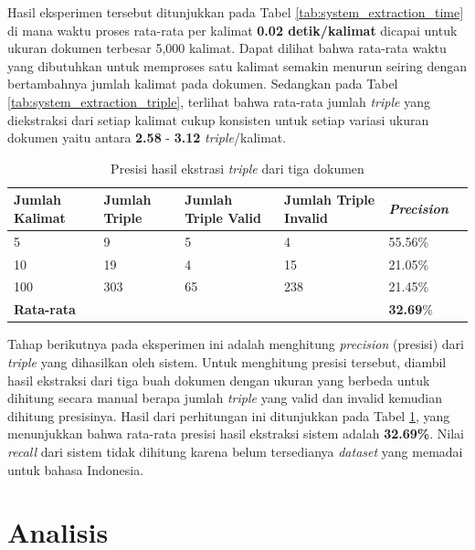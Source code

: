 Hasil eksperimen tersebut ditunjukkan pada Tabel \ref{tab:system_extraction_time} di mana waktu proses rata-rata per kalimat \textbf{0.02 detik/kalimat} dicapai untuk ukuran dokumen terbesar 5,000 kalimat. Dapat dilihat bahwa rata-rata waktu yang dibutuhkan untuk memproses satu kalimat semakin menurun seiring dengan bertambahnya jumlah kalimat pada dokumen. Sedangkan pada Tabel \ref{tab:system_extraction_triple}, terlihat bahwa rata-rata jumlah \textit{triple} yang diekstraksi dari setiap kalimat cukup konsisten untuk setiap variasi ukuran dokumen yaitu antara \textbf{2.58} - \textbf{3.12} \textit{triple}/kalimat. 

\begin{table}
	\caption{Presisi hasil ekstrasi \textit{triple} dari tiga dokumen}
	\label{tab:system_extraction_precision}
	\centering
	\begin{tabular}{l p{2cm} p{2cm} p{2cm} p{2cm} p{2cm}}
		\hline
		\textbf{Jumlah Kalimat} & \textbf{Jumlah Triple} & \textbf{Jumlah Triple Valid} & \textbf{Jumlah Triple Invalid} & \textbf{\textit{Precision}} \\
		\hline			
		5 & 9 & 5 & 4 & 55.56\% \\
		10 & 19 & 4 & 15 & 21.05\% \\
		100 & 303 & 65 & 238 & 21.45\% \\
		\hline
		\textbf{Rata-rata} & & & & \textbf{32.69}\% \\
		\hline
	\end{tabular}
\end{table}

Tahap berikutnya pada eksperimen ini adalah menghitung \textit{precision} (presisi) dari \textit{triple} yang dihasilkan oleh sistem. Untuk menghitung presisi tersebut, diambil hasil ekstraksi dari tiga buah dokumen dengan ukuran yang berbeda untuk dihitung secara manual berapa jumlah \textit{triple} yang valid dan invalid kemudian dihitung presisinya. Hasil dari perhitungan ini ditunjukkan pada Tabel \ref{tab:system_extraction_precision}, yang menunjukkan bahwa rata-rata presisi hasil ekstraksi sistem adalah \textbf{32.69\%}. Nilai \textit{recall} dari sistem tidak dihitung karena belum tersedianya \textit{dataset} yang memadai untuk bahasa Indonesia.

\section{Analisis}

